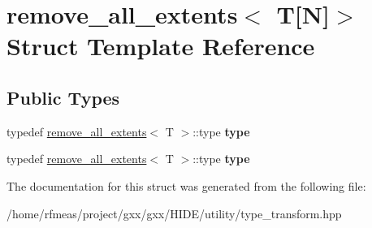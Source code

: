 \hypertarget{structremove__all__extents_3_01T[N]_4}{}\section{remove\+\_\+all\+\_\+extents$<$ T\mbox{[}N\mbox{]}$>$ Struct Template Reference}
\label{structremove__all__extents_3_01T[N]_4}
\subsection*{Public Types}
\begin{DoxyCompactItemize}
\item 
typedef \hyperlink{structremove__all__extents}{remove\+\_\+all\+\_\+extents}$<$ T $>$\+::type {\bfseries type}\hypertarget{structremove__all__extents_3_01T[N]_4_a8e80028fa8a2017accd378c9752bc4ca}{}\label{structremove__all__extents_3_01T[N]_4_a8e80028fa8a2017accd378c9752bc4ca}

\item 
typedef \hyperlink{structremove__all__extents}{remove\+\_\+all\+\_\+extents}$<$ T $>$\+::type {\bfseries type}\hypertarget{structremove__all__extents_3_01T[N]_4_a8e80028fa8a2017accd378c9752bc4ca}{}\label{structremove__all__extents_3_01T[N]_4_a8e80028fa8a2017accd378c9752bc4ca}

\end{DoxyCompactItemize}


The documentation for this struct was generated from the following file\+:\begin{DoxyCompactItemize}
\item 
/home/rfmeas/project/gxx/gxx/\+H\+I\+D\+E/utility/type\+\_\+transform.\+hpp\end{DoxyCompactItemize}
